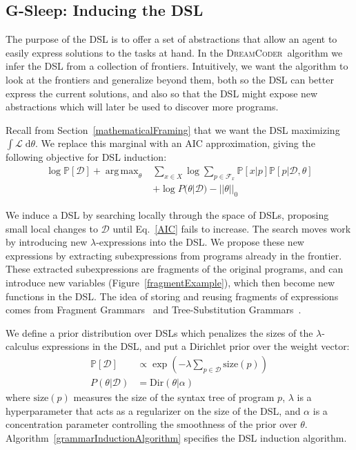 \documentclass{article}
\newcommand{\system}{\textsc{DreamCoder}~}
\newcommand{\lowerBound}{\mathscr{L}}
\DeclareMathOperator*{\argmax}{arg\,max} %
\newcommand{\probability}{\mathds{P}} %
\begin{document}
\subsection{G-Sleep: Inducing the DSL}\label{grammarInductionSection}

The purpose of the DSL is to
offer a set of abstractions
that allow an agent to easily express solutions to the tasks at hand.
In the \system algorithm we infer the DSL from a collection of frontiers.
Intuitively, we want the algorithm to
look at  the frontiers and
generalize beyond them, 
both so the DSL can better express the current solutions,
and  also so that the DSL might expose new abstractions
which will later be used to
discover more programs.

Recall from Section~\ref{mathematicalFraming} that we want the DSL maximizing $\int \lowerBound\;\mathrm{d}\theta$.
We replace this marginal with an AIC approximation, giving the following objective for DSL induction:
\begin{align}
\nonumber  \log \probability[\mathcal{D}] + \argmax_{\theta}& \sum_{x\in X}\log \sum_{p\in \mathcal{F}_x}\probability[x|p]\probability[p|\mathcal{D},\theta]\\
&+  \log P(\theta|\mathcal{D}) - ||\theta||_0 \label{AIC}
  \end{align}

We induce a DSL by searching locally through the space of DSLs,
proposing small local changes to $\mathcal{D}$ until Eq.~\ref{AIC} fails to increase.
The search moves work by introducing new
$\lambda$-expressions into the DSL.
We propose these new expressions by extracting subexpressions from
programs already in the frontier.
These extracted subexpressions
are fragments of the original programs, and can introduce new variables (Figure~\ref{fragmentExample}),
which then become new functions in the DSL.
The idea of storing and reusing
fragments of expressions comes from Fragment Grammars~\cite{tim} and Tree-Substitution Grammars~\cite{cohn2010inducing}.



We define a prior distribution over DSLs which penalizes the sizes of the $\lambda$-calculus expressions in the DSL, and put a Dirichlet prior over the weight vector:
\begin{align*}
  \probability[\mathcal{D}]&\propto\exp\left(-\lambda\sum_{p\in \mathcal{D}}\text{size}(p) \right)\\
  P(\theta|\mathcal{D})& = \text{Dir}(\theta|\alpha)
\end{align*}
where $\text{size}(p)$  measures the size of the syntax tree of program $p$,
$\lambda$ is a hyperparameter that acts as a regularizer on the size of the DSL,
and $\alpha$ is a concentration parameter controlling the smoothness of the prior over $\theta$.
Algorithm~\ref{grammarInductionAlgorithm} specifies the DSL induction algorithm.
\end{document}
